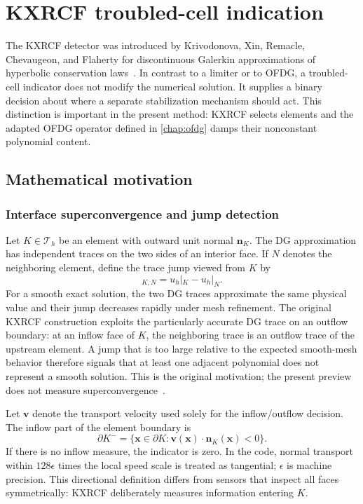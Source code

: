 \section{KXRCF troubled-cell indication}
\label{chap:kxrcf}

The KXRCF detector was introduced by Krivodonova, Xin, Remacle,
Chevaugeon, and Flaherty for discontinuous Galerkin approximations of
hyperbolic conservation laws~\cite{KrivodonovaEtAl2004}.  In contrast to a
limiter or to OFDG, a troubled-cell indicator does not modify the numerical
solution.  It supplies a binary decision about where a separate stabilization
mechanism should act.  This distinction is important in the present method:
KXRCF selects elements and the adapted OFDG operator defined in
\cref{chap:ofdg} damps their nonconstant polynomial content.

\subsection{Mathematical motivation}

\subsubsection{Interface superconvergence and jump detection}

Let $K\in\mathcal{T}_h$ be an element with outward unit normal
$\boldsymbol n_K$.  The DG approximation has independent traces on the two
sides of an interior face.  If $N$ denotes the neighboring element, define the
trace jump viewed from $K$ by
\begin{equation}
  [u_h]_{K,N}=u_h|_K-u_h|_N.
  \label{eq:kxrcf-jump}
\end{equation}
For a smooth exact solution, the two DG traces approximate the same physical
value and their jump decreases rapidly under mesh refinement.  The original
KXRCF construction exploits the particularly accurate DG trace on an outflow
boundary: at an inflow face of $K$, the neighboring trace is an outflow trace
of the upstream element.  A jump that is too large relative to the expected
smooth-mesh behavior therefore signals that at least one adjacent polynomial
does not represent a smooth solution.  This is the original motivation; the present preview does not measure superconvergence~\cite{KrivodonovaEtAl2004,QiuShu2005}.

Let $\boldsymbol v$ denote the transport velocity used solely for the
inflow/outflow decision.  The inflow part of the element boundary is
\begin{equation}
  \partial K^-
  =\{\boldsymbol x\in\partial K:
       \boldsymbol v(\boldsymbol x)\cdot\boldsymbol n_K(\boldsymbol x)<0\}.
  \label{eq:kxrcf-inflow}
\end{equation}
If there is no inflow measure, the indicator is zero. In the code, normal transport within $128\epsilon$ times the local speed scale is treated as tangential; $\epsilon$ is machine precision.  This
directional definition differs from sensors that inspect all faces
symmetrically: KXRCF deliberately measures information entering $K$.

